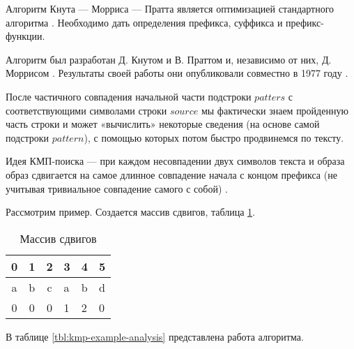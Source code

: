 Алгоритм Кнута — Морриса — Пратта является оптимизацией стандартного алгоритма \cite{Smyth}.
Необходимо дать определения префикса, суффикса и префикс-функции.

Алгоритм был разработан Д. Кнутом и В. Праттом и, независимо от них, Д. Моррисом \cite{Kormen}.
Результаты своей работы они опубликовали совместно в 1977 году \cite{Knuth}.

После частичного совпадения начальной части подстроки $patters$ с соответствующими символами строки $source$ мы фактически знаем пройденную часть строки и может «вычислить» некоторые сведения (на основе самой подстроки $pattern$), с помощью которых потом быстро продвинемся по тексту.

Идея КМП-поиска — при каждом несовпадении двух символов текста и образа образ сдвигается на самое длинное совпадение начала с концом префикса (не учитывая тривиальное совпадение самого с собой) \cite{Okulov}.

Рассмотрим пример. Создается массив сдвигов, таблица \ref{tbl:kmp-shift-analysis}.

\begin{table}[!h]
	\begin{center}
		\begin{tabular}{|c|c|c|l|l|l|}
			\hline
			0 & 1 & 2 & 3 & 4 & 5 \\ \hline
			a & b & c & a & b & d \\ \hline
			0 & 0 & 0 & 1 & 2 & 0 \\ \hline
		\end{tabular}
	\end{center}
	\caption{Массив сдвигов}
	\label{tbl:kmp-shift-analysis}
\end{table}

В таблице \ref{tbl:kmp-example-analysis} представлена работа алгоритма.

